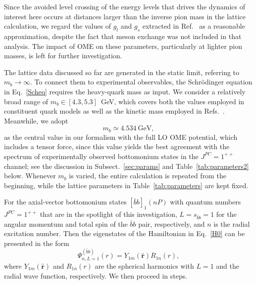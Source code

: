 \documentclass[aps,prd,showpacs,amsmath,twocolumn,superscriptaddress,floatfix,nofootinbib,notitlepage]{revtex4-2}
\newcommand{\bbnP}{[\bar{b}b]_1(nP)}
\newcommand{\psibb}{\Psi^{(\bar{b}b)}}
\newcommand{\ver}{{\bm r}}
\newcommand{\be}{\begin{equation}}
\newcommand{\ee}{\end{equation}}
\begin{document}
 Since the avoided level crossing of the energy levels that drives the dynamics of interest here occurs at distances larger than the inverse pion mass in the lattice calculation, we regard the values of $g_l$ and $g_s$ extracted in Ref.~\cite{Bulava:2024jpj} as a reasonable approximation, despite the fact that meson exchange was not included in that analysis. The impact of OME on these parameters, particularly at lighter pion masses, is left for further investigation.

The lattice data discussed so far are generated in the static limit, referring to $m_b\to\infty$. To connect them to experimental observables, the Schr{\"o}dinger equation in Eq.~\eqref{Scheq} requires the heavy-quark mass as input. 
We consider a relatively broad range of $m_b \in [4.3,5.3]$~GeV, which covers both the values employed in constituent quark models as well as
the kinetic mass employed in Refs.~\cite{Berwein:2024ztx,Brambilla:2024imu}. Meanwhile, we adopt
\be
m_b\simeq 4.534~\mbox{GeV},
\label{mb}
\ee
as the central value in our formalism with the full LO OME potential, which includes a tensor force, since this value yields the best agreement with the spectrum of experimentally observed bottomonium states in the $J^{PC}=1^{++}$ channel; see the discussion in Subsect.~\ref{sec:params} and Table~\ref{tab:parameters2} below.
Whenever $m_b$ is varied, the entire calculation is repeated from the beginning, while the lattice parameters in Table~\ref{tab:parameters} are kept fixed.

For the axial-vector bottomonium states $\bbnP$ with quantum numbers $J^{PC}=1^{++}$ that are in the spotlight of this investigation, $L=s_{\bar b b}=1$ for the angular momentum and total spin of the $\bar{b}b$ pair, respectively, and $n$ is the radial excitation number. Then the eigenstates of the Hamiltonian in Eq.~\eqref{H0} can be presented in the form
\be
\psibb_{n,L=1}(r)=Y_{1m}(\hat{\ver})R_{1n}(r),
\label{psi}
\ee
where $Y_{1m}(\hat{\ver})$ and $R_{1n}(r)$ are the spherical harmonics with $L=1$ and the radial wave function, respectively. We then proceed in steps.
\end{document}
